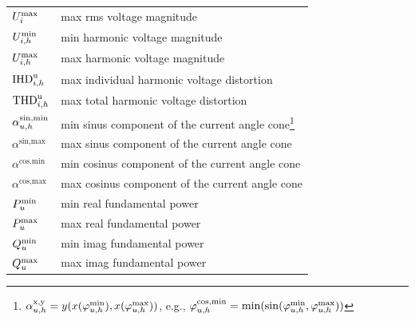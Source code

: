 \documentclass[journal]{IEEEtran}
\begin{document}
\begin{table}[H]
\begin{tabular}{l l }
        $U^{\text{max}}_{i}$                                                   & max rms voltage magnitude                         \\
        $U^{\text{min}}_{i,h}$                                         & min harmonic voltage magnitude                    \\
        $U^{\text{max}}_{i,h}$                                         & max harmonic voltage magnitude                    \\
        $\text{IHD}^{\text{u}}_{i,h}$                                   & max individual harmonic voltage distortion        \\
        $\text{THD}^{\text{u}}_{i,h}$                                   & max total harmonic voltage distortion             \\ \hline
        $\alpha^{\text{sin,min}}_{u,h}$                                 & min sinus component of the current  angle cone\footnote{$\alpha^{\text{x,y}}_{u,h} = y(x(\varphi_{u,h}^{\text{min}}),x(\varphi_{u,h}^{\text{max}}))$, e.g., $\varphi_{u,h}^{\text{cos,min}} = \min(\sin(\varphi_{u,h}^{\text{min}},\varphi_{u,h}^{\text{max}}))$}       \\
        $\alpha^{\text{sin,max}}$                                                   & max sinus component of the current angle cone     \\
        $\alpha^{\text{cos,min}}$                                                   & min cosinus component of the current angle cone   \\
        $\alpha^{\text{cos,max}}$                                                   & max cosinus component of the current angle cone   \\
        $P^{\text{min}}_{u}$                                                 & min real fundamental power                        \\
        $P^{\text{max}}_{u}$                                                 & max real fundamental power                        \\
        $Q^{\text{min}}_{u}$                                            & min imag fundamental power                        \\
        $Q^{\text{max}}_{u}$                                            & max imag fundamental power                        \\
    \end{tabular}
\end{table}
\end{document}
